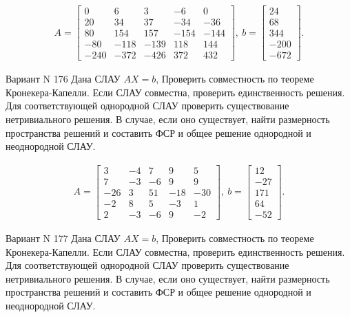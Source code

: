 \documentclass[11pt]{report}
\begin{document}
\begin{align*}
 A = \left[\begin{matrix}0 & 6 & 3 & -6 & 0\\20 & 34 & 37 & -34 & -36\\80 & 154 & 157 & -154 & -144\\-80 & -118 & -139 & 118 & 144\\-240 & -372 & -426 & 372 & 432\end{matrix}\right],
\ b = \left[\begin{matrix}24\\68\\344\\-200\\-672\end{matrix}\right]. 
 \end{align*}

Вариант N 176
Дана СЛАУ $AX = b$,
Проверить совместность по теореме Кронекера-Капелли. Если СЛАУ совместна, проверить единственность решения.
Для соответствующей однородной СЛАУ проверить существование нетривиального решения. В случае, если оно существует,
найти размерность пространства решений и составить ФСР и общее решение однородной  и неоднородной СЛАУ.


\begin{align*}
 A = \left[\begin{matrix}3 & -4 & 7 & 9 & 5\\7 & -3 & -6 & 9 & 9\\-26 & 3 & 51 & -18 & -30\\-2 & 8 & 5 & -3 & 1\\2 & -3 & -6 & 9 & -2\end{matrix}\right],
\ b = \left[\begin{matrix}12\\-27\\171\\64\\-52\end{matrix}\right]. 
 \end{align*}

Вариант N 177
Дана СЛАУ $AX = b$,
Проверить совместность по теореме Кронекера-Капелли. Если СЛАУ совместна, проверить единственность решения.
Для соответствующей однородной СЛАУ проверить существование нетривиального решения. В случае, если оно существует,
найти размерность пространства решений и составить ФСР и общее решение однородной  и неоднородной СЛАУ.
\end{document}
